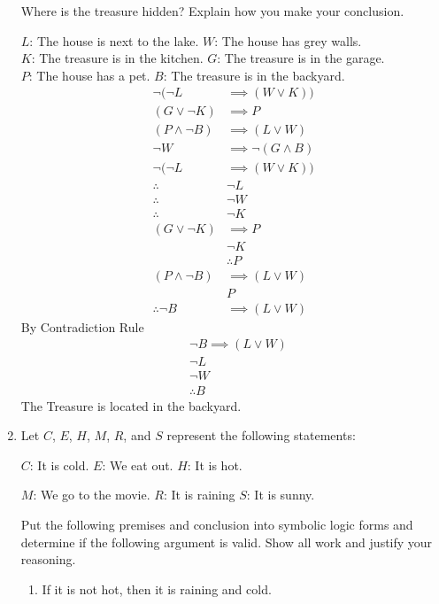 \documentclass[12pt,letterpaper,titlepage]{article}
\begin{document}
\begin{raggedright}
\begin{enumerate}
Where is the treasure hidden? Explain how you make your conclusion.

$L$: The house is next to the lake. $W$: The house has grey walls. \\
$K$: The treasure is in the kitchen. $G$: The treasure is in the garage.\\
$P$: The house has a pet. $B$: The treasure is in the backyard.
\begin{align*}
   \neg(\neg L &\implies (W \lor K))
\\ (G \lor \neg K)&\implies P
\\ (P\land \neg B) &\implies (L \lor W)
\\ \neg W &\implies \neg (G \land B)
\\\neg(\neg L &\implies (W \lor K))
\\\therefore &\neg L
\\\therefore &\neg W
\\\therefore &\neg K
\\(G \lor \neg K)&\implies P
\\&\neg K
\\&\therefore P
\\(P\land \neg B) &\implies (L \lor W)
\\&P
\\\therefore\neg B &\implies (L \lor W)
\end{align*}
By Contradiction Rule
\begin{align*}
&\neg B \implies (L \lor W)
\\&\neg L
\\&\neg W
\\&\therefore B
\end{align*}
The Treasure is located in the backyard.
\pagebreak

\item Let $C$, $E$, $H$, $M$, $R$, and $S$ represent the following statements: 

$C$: It is cold. $E$: We eat out. $H$: It is hot. 

$M$: We go to the movie. $R$: It is raining $S$: It is sunny. 

Put the following premises and conclusion into symbolic logic forms and determine if the following argument is valid. Show all work and justify your reasoning.
\begin{enumerate}[label=(\alph*)]
\item If it is not hot, then it is raining and cold.


\end{enumerate}
\end{enumerate}
\end{raggedright}
\end{document}
